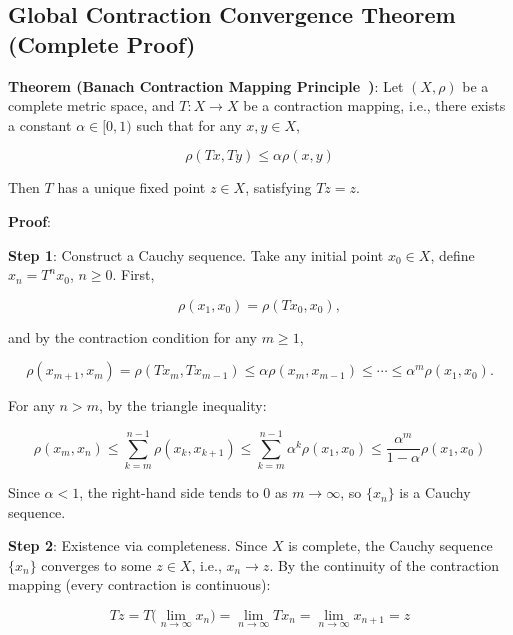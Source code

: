 \documentclass[11pt,a4paper]{amsart}
\begin{document}
\subsection{Global Contraction Convergence Theorem (Complete Proof)}

\textbf{Theorem (Banach Contraction Mapping Principle~\cite{banach1922})}: Let $(X, \rho)$ be a complete metric space, and $T: X \to X$ be a contraction mapping, i.e., there exists a constant $\alpha \in [0, 1)$ such that for any $x, y \in X$,

\begin{equation}
\label{eq:contraction-def}
\rho(Tx, Ty) \le \alpha \rho(x, y)
\end{equation}

Then $T$ has a unique fixed point $z \in X$, satisfying $Tz = z$.

\textbf{Proof}:

\textbf{Step 1}: Construct a Cauchy sequence. Take any initial point $x_0 \in X$, define $x_n = T^n x_0$, $n \ge 0$. First,

\begin{equation}
\rho(x_1, x_0) = \rho(Tx_0, x_0),
\end{equation}

and by the contraction condition for any $m \ge 1$,

\begin{equation}
\rho(x_{m+1}, x_m) = \rho(Tx_m, Tx_{m-1}) \le \alpha \rho(x_m, x_{m-1}) \le \cdots \le \alpha^m \rho(x_1, x_0).
\end{equation}

For any $n > m$, by the triangle inequality:

\begin{equation}
\rho(x_m, x_n) \le \sum_{k=m}^{n-1} \rho(x_k, x_{k+1}) \le \sum_{k=m}^{n-1} \alpha^k \rho(x_1, x_0) \le \frac{\alpha^m}{1-\alpha} \rho(x_1, x_0)
\end{equation}

Since $\alpha < 1$, the right-hand side tends to $0$ as $m \to \infty$, so $\{x_n\}$ is a Cauchy sequence.

\textbf{Step 2}: Existence via completeness. Since $X$ is complete, the Cauchy sequence $\{x_n\}$ converges to some $z \in X$, i.e., $x_n \to z$. By the continuity of the contraction mapping (every contraction is continuous):

\begin{equation}
Tz = T\Big(\lim_{n\to\infty} x_n\Big) = \lim_{n\to\infty} Tx_n = \lim_{n\to\infty} x_{n+1} = z
\end{equation}
\end{document}
